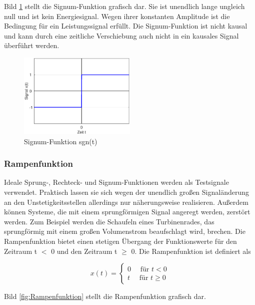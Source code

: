 \noindent Bild \ref{fig:Signum} stellt die Signum-Funktion grafisch dar. Sie ist unendlich lange ungleich null und ist kein Energiesignal. Wegen ihrer konstanten Amplitude ist die Bedingung f\"{u}r ein Leistungssignal erf\"{u}llt. Die Signum-Funktion ist nicht kausal und kann durch eine zeitliche Verschiebung auch nicht in ein kausales Signal \"{u}berf\"{u}hrt werden.


\begin{figure}[ht]
  \centerline{\includegraphics[width=0.5\textwidth]{Kapitel1/Bilder/image8.eps}}
  \caption{Signum-Funktion sgn(t)}
  \label{fig:Signum}
\end{figure}

\subsubsection{Rampenfunktion}

\noindent Ideale Sprung-, Rechteck- und Signum-Funktionen werden als Testsignale verwendet. Praktisch lassen sie sich wegen der unendlich gro{\ss}en Signal\"{a}nderung an den Unstetigkeitsstellen allerdings nur n\"{a}herungsweise realisieren. Au{\ss}erdem k\"{o}nnen Systeme, die mit einem sprungf\"{o}rmigen Signal angeregt werden, zerst\"{o}rt werden. Zum Beispiel werden die Schaufeln eines Turbinenrades, das sprungf\"{o}rmig mit einem gro{\ss}en Volumenstrom beaufschlagt wird, brechen. Die Rampenfunktion bietet einen stetigen \"{U}bergang der Funktionswerte f\"{u}r den Zeitraum t $\mathrm{<}$ 0 und den Zeitraum t $\mathrm{\ge}$ 0. Die Rampenfunktion ist definiert als

\begin{equation}\label{eq:onethirtyone}
x(t)=\left\{\begin{array}{ll} 
{0 \quad \text{ für }t<0} \\ 
{t \quad \text{ für }t \ge 0} 
\end{array}\right.
\end{equation}


\noindent Bild \ref{fig:Rampenfunktion} stellt die Rampenfunktion grafisch dar.

